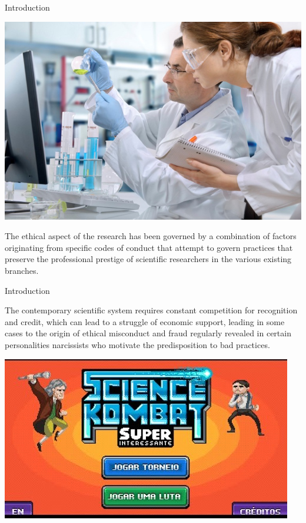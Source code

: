 \begin{frame}{Introduction}
    \begin{minipage}{0.45\linewidth}    
        \centering
        \includegraphics[scale=0.22]{images/ima2.jpg}
    \end{minipage}
    \hspace{0.4cm}
    \begin{minipage}{0.45\linewidth}
        The ethical aspect of the research has been governed by a combination of factors originating from specific codes of conduct 
that attempt to govern practices that preserve the professional prestige of scientific researchers in the various existing branches.
    \end{minipage}
\end{frame}
\begin{frame}{Introduction}
    \begin{minipage}{0.45\linewidth}
        The contemporary scientific system requires constant competition for recognition and credit, which can lead to a struggle
of economic support, leading in some cases to the origin of ethical misconduct and fraud regularly revealed in certain personalities
narcissists who motivate the predisposition to bad practices.\\
    \end{minipage}
    \hspace{0.5cm}
    \begin{minipage}{0.4\linewidth}
        \centering
        \includegraphics[scale=0.45]{images/ima3.jpg}
    \end{minipage}
\end{frame}